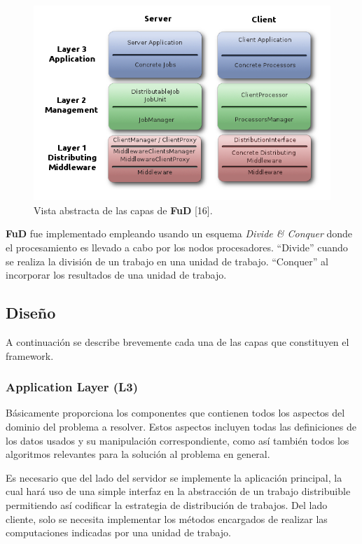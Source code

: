 \begin{figure}[h!] \hspace{.60cm}
    \includegraphics[scale=.55]{image/AbstractLayers.png}
    \caption{Vista abstracta de las capas de \textbf{FuD} [16].} 
    \label{disenioFud}
\end{figure}

\par \textbf{FuD} fue implementado empleando usando un esquema \emph{Divide \& Conquer} donde el procesamiento es llevado a cabo por los nodos procesadores. ``Divide'' cuando se realiza la división de un trabajo en una unidad de trabajo. ``Conquer'' al incorporar los resultados de una unidad de trabajo.

\subsection{Diseño}
A continuación se describe brevemente cada una de las capas que constituyen el framework.

\subsubsection{Application Layer (L3)} %
\par Básicamente proporciona los componentes que contienen todos los aspectos del dominio del problema a resolver. Estos aspectos incluyen todas las definiciones de los datos usados y su manipulación correspondiente, como así también todos los algoritmos relevantes para la solución al problema en general. 

\par Es necesario que del lado del servidor se implemente la aplicación principal, la cual hará uso de 	
una simple interfaz en la abstracción de un trabajo distribuible permitiendo así codificar la estrategia de
distribución de trabajos. Del lado cliente, solo se necesita implementar los métodos encargados de realizar
las computaciones indicadas por una unidad de trabajo.

